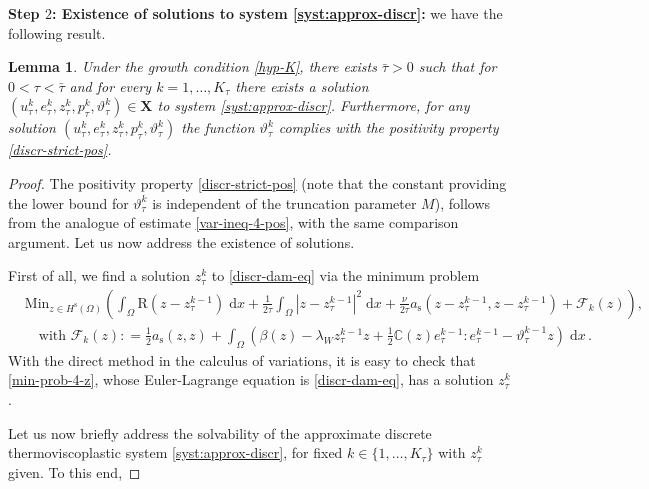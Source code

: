 \documentclass[a4paper,10pt,reqno]{amsart}
\numberwithin{equation}{section}
\numberwithin{equation}{section}
\newtheorem{lemma}[theorem]{Lemma}
\def\dd{\;\!\mathrm{d}} %
\newcommand{\teta}{\vartheta}
\newcommand{\bbC}{\mathbb{C}}
\newcommand{\did}[1]{\mathrm{R}(#1)}
\newcommand{\spz}{H^{\mathrm{s}}(\Omega)}
\newcommand{\ass}{a_{\mathrm{s}}}
\newcommand{\bsp}{\mathbf{X}}
\newcommand{\utau}[1]{u_\tau^{#1}}
\newcommand{\ptau}[1]{p_\tau^{#1}}
\newcommand{\ztau}[1]{z_\tau^{#1}}
\newcommand{\etau}[1]{e_\tau^{#1}}
\newcommand{\tetau}[1]{\teta_\tau^{#1}}
\begin{document}
\par
\noindent 
\textbf{Step $2$:  Existence of solutions to  system \eqref{syst:approx-discr}:} 
we have the following result.
\begin{lemma}
\label{l:exist-approx-discr} 
Under  the growth condition \eqref{hyp-K}, there exists $\bar\tau>0$ such that  for $0<\tau< \bar \tau$ 
and  for every $k=1,\ldots, K_\tau$ there exists a solution $(\utau{k}, \etau{k},\ztau k, \ptau{k},\tetau k) \in
\bsp  $ to system \eqref{syst:approx-discr}. Furthermore, for any solution  $(\utau{k}, \etau{k},\ztau k, \ptau{k},\tetau k) $ the function
  $\tetau k$ complies with the positivity property \eqref{discr-strict-pos}. 
\end{lemma}
\begin{proof}
The positivity property \eqref{discr-strict-pos} (note that the constant providing the lower bound for $\tetau k$ is 
  independent of the truncation parameter $M$),
 follows from the analogue of estimate \eqref{var-ineq-4-pos}, with the  same  comparison argument. 
 Let us now address the existence of solutions. 
 \par
 First of all, we  find a solution $\ztau k$ to \eqref{discr-dam-eq}  via the minimum problem
 \begin{equation}
 \label{min-prob-4-z}
 \begin{aligned}
 &
 \mathrm{Min}_{z \in \spz} \left(\int_\Omega  \did{z{-}\ztau{k-1}} \dd x  + 
 \frac1{2\tau} \int_\Omega  |z{-}\ztau{k-1}|^2  \dd x + \frac{\nu}{2\tau} \ass(z{-}\ztau{k-1}, z{-}\ztau{k-1}) + \mathscr{F}_k(z)
 \right),
 \\
 &\quad \text{with } 
  \mathscr{F}_k(z): = \frac12 \ass (z,z) + \int_\Omega \left(\beta(z) {-} \lambda_W \ztau{k-1} z {+} \tfrac12 {\bbC}(z) \etau{k-1}{:}\etau{k-1} -\tetau{k-1}z \right) \dd x\,.
  \end{aligned}
 \end{equation}
 With the direct method in the calculus of variations, it is easy to check that \eqref{min-prob-4-z}, whose Euler-Lagrange equation is \eqref{discr-dam-eq},
  has a solution $\ztau{k}$.
 \par
Let us now briefly address the solvability of the approximate 
discrete thermoviscoplastic system \eqref{syst:approx-discr}, for fixed $k \in \{1,\ldots, K_\tau\}$ with
$\ztau{k}$ given. 
 To this end,

\end{proof}
\end{document}
